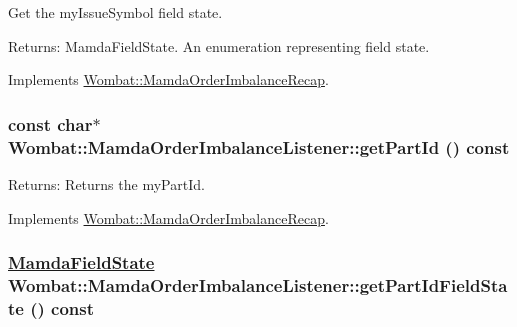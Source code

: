 Get the my\-Issue\-Symbol field state. 

\begin{Desc}
\item[Returns:]Mamda\-Field\-State. An enumeration representing field state. \end{Desc}


Implements \hyperlink{classWombat_1_1MamdaOrderImbalanceRecap_955e7f821258342ee01c9d897f6c3d34}{Wombat::Mamda\-Order\-Imbalance\-Recap}.\hypertarget{classWombat_1_1MamdaOrderImbalanceListener_2f47719f14e5d1280791c8d832522589}{
\subsubsection[getPartId]{\setlength{\rightskip}{0pt plus 5cm}const char$\ast$ Wombat::Mamda\-Order\-Imbalance\-Listener::get\-Part\-Id () const}}
\label{classWombat_1_1MamdaOrderImbalanceListener_2f47719f14e5d1280791c8d832522589}


\begin{Desc}
\item[Returns:]Returns the my\-Part\-Id. \end{Desc}


Implements \hyperlink{classWombat_1_1MamdaOrderImbalanceRecap_a6b1ce60263dc71feb68e3387359f31e}{Wombat::Mamda\-Order\-Imbalance\-Recap}.\hypertarget{classWombat_1_1MamdaOrderImbalanceListener_d8f5442d6f66c8a21c32581c66033146}{
\subsubsection[getPartIdFieldState]{\setlength{\rightskip}{0pt plus 5cm}\hyperlink{namespaceWombat_93aac974f2ab713554fd12a1fa3b7d2a}{Mamda\-Field\-State} Wombat::Mamda\-Order\-Imbalance\-Listener::get\-Part\-Id\-Field\-State () const}}
\label{classWombat_1_1MamdaOrderImbalanceListener_d8f5442d6f66c8a21c32581c66033146}


